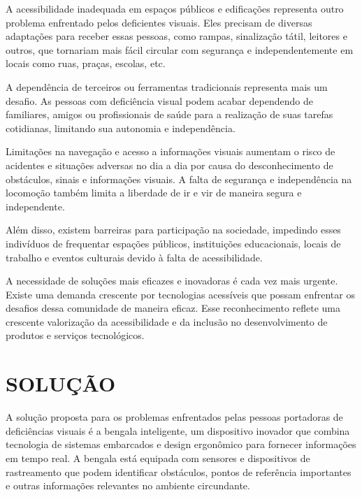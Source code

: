 A acessibilidade inadequada em espaços públicos e edificações representa outro problema enfrentado pelos deficientes visuais. Eles precisam de diversas adaptações para receber essas pessoas, como rampas, sinalização tátil, leitores e outros, que tornariam mais fácil circular com segurança e independentemente em locais como ruas, praças, escolas, etc.

A dependência de terceiros ou ferramentas tradicionais representa mais um desafio. As pessoas com deficiência visual podem acabar dependendo de familiares, amigos ou profissionais de saúde para a realização de suas tarefas cotidianas, limitando sua autonomia e independência.

Limitações na navegação e acesso a informações visuais aumentam o risco de acidentes e situações adversas no dia a dia por causa do desconhecimento de obstáculos, sinais e informações visuais. A falta de segurança e independência na locomoção também limita a liberdade de ir e vir de maneira segura e independente.

Além disso, existem barreiras para participação na sociedade, impedindo esses indivíduos de frequentar espações públicos, instituições educacionais, locais de trabalho e eventos culturais devido à falta de acessibilidade.


A necessidade de soluções mais eficazes e inovadoras é cada vez mais urgente. Existe uma demanda crescente por tecnologias acessíveis que possam enfrentar os desafios dessa comunidade de maneira eficaz. Esse reconhecimento reflete uma crescente valorização da acessibilidade e da inclusão no desenvolvimento de produtos e serviços tecnológicos.

\section{SOLUÇÃO}
A solução proposta para os problemas enfrentados pelas pessoas portadoras de deficiências visuais é a bengala inteligente, um dispositivo inovador que combina tecnologia de sistemas embarcados e design ergonômico para fornecer informações em tempo real. A bengala está equipada com sensores e dispositivos de rastreamento que podem identificar obstáculos, pontos de referência importantes e outras informações relevantes no ambiente circundante.


